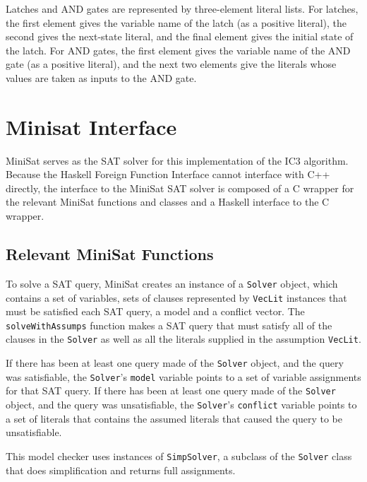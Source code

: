 \documentclass[12pt,a4paper,twoside,openright]{report}
\begin{document}
Latches and AND gates are represented by three-element literal lists.
For latches, the first element gives the variable name of the latch (as a positive literal),
the second gives the next-state literal, and the final element gives the initial state
of the latch. For AND gates, the first element gives the variable name of the AND gate
(as a positive literal), and the next two elements give the literals whose values are taken
as inputs to the AND gate.

\section{Minisat Interface}

MiniSat serves as the SAT solver for this implementation of the IC3 algorithm.
Because the Haskell Foreign Function Interface cannot interface with C++ directly,
the interface to the MiniSat SAT solver is composed of a C wrapper for the relevant
MiniSat functions and classes and a Haskell interface to the C wrapper.

\subsection{Relevant MiniSat Functions}

To solve a SAT query, MiniSat creates an instance of a \verb,Solver, object,
which contains a set of variables, sets of clauses represented by \verb,VecLit, instances
that must be satisfied each SAT query, a model and a conflict vector.
The \verb,solveWithAssumps, function makes a SAT query that must satisfy all of the clauses
in the \verb,Solver, as well as all the literals supplied in the assumption \verb,VecLit,.

If there has been at least one query made of the \verb,Solver, object, and the query was
satisfiable, the \verb,Solver,'s \verb,model, variable points to a set of variable assignments
for that SAT query.
If there has been at least one query made of the \verb,Solver, object, and the query was
unsatisfiable, the \verb,Solver,'s \verb,conflict, variable points to a set of literals that
contains the assumed literals that caused the query to be unsatisfiable.

This model checker uses instances of \verb,SimpSolver,, a subclass of the \verb,Solver, class
that does simplification and returns full assignments.
\end{document}
